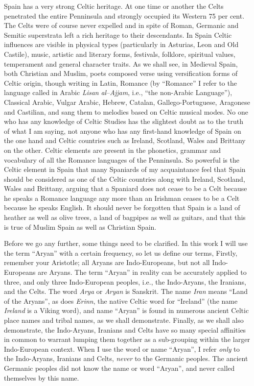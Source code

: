 Spain has a very strong Celtic heritage. At one time or another the Celts penetrated the entire Penninsula and strongly occupied its Western 75 per cent. The Celts were of course never expelled and in spite of Roman, Germanic and Semitic superstrata left a rich heritage to their descendants. In Spain Celtic influences are visible in physical types (particularly in Asturias, Leon and Old Castile), music, artistic and literary forms, festivals, folklore, spiritual values, temperament and general character traits. As we shall see, in Medieval Spain, both Christian and Muslim, poets composed verse using versification forms of Celtic origin, though writing in Latin, Romance (by ``Romance'' I refer to the language called in Arabic \emph{Lisan} \emph{al}--\emph{Ajjam}, i.e., ``the non-Arabic Language''), Classical Arabic, Vulgar Arabic, Hebrew, Catalan, Gallego-Portuguese, Aragonese and Castilian, and sang them to melodies based on Celtic musical modes. No one who has any knowledge of Celtic Studies has the slightest doubt as to the truth of what I am saying, not anyone who has any first-hand knowledge of Spain on the one hand and Celtic countries such as Ireland, Scotland, Wales and Brittany on the other. Celtic elements are present in the phonetics, grammar and vocabulary of all the Romance languages of the Penninsula. So powerful is the Celtic element in Spain that many Spaniards of my acquaintance feel that Spain should be considered as one of the Celtic countries along with Ireland, Scotland, Wales and Brittany, arguing that a Spaniard does not cease to be a Celt because he speaks a Romance language any more than an Irishman ceases to be a Celt because he speaks English. It should never be forgotten that Spain is a land of heather as well as olive trees, a land of bagpipes as well as guitars, and that this is true of Muslim Spain as well as Christian Spain.

Before we go any further, some things need to be clarified. In this work I will use the term ``Aryan'' with a certain frequency, so let us define our terms, Firstly, remember your Aristotle; all Aryans are Indo-Europeans, but not all Indo-Europeans are Aryans. The term ``Aryan'' in reality can be accurately applied to three, and only three Indo-European peoples, i.e., the Indo-Aryans, the Iranians, and the Celts. The word \emph{Arya} or \emph{Aryan} is Sanskrit. The name \emph{Iran} means ``Land of the Aryans'', as does \emph{Erinn}, the native Celtic word for ``Ireland'' (the name \emph{Ireland} is a Viking word), and name ``Aryan'' is found in numerous ancient Celtic place names and tribal names, as we shall demonstrate. Finally, as we shall also demonstrate, the Indo-Aryans, Iranians and Celts have so many special affinities in common to warrant lumping them together as a sub-grouping within the larger Indo-European context. When I use the word or name ``Aryan'', I refer \emph{only} to the Indo-Aryans, Iranians and Celts, \emph{never} to the Germanic peoples. The ancient Germanic peoples did not know the name or word ``Aryan'', and never called themselves by this name.

